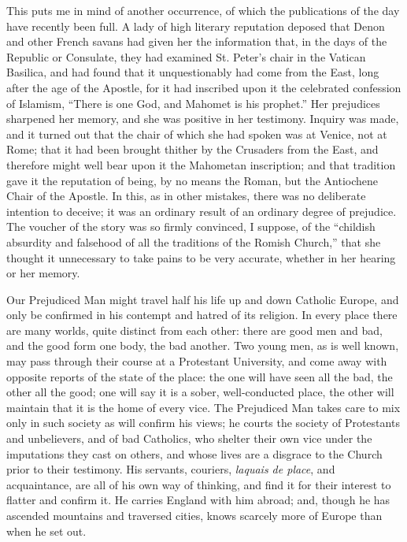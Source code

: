 This puts me in mind of another occurrence, of which
the publications of the day have recently been full. A
lady of high literary reputation deposed that Denon and
other French savans had given her the information that,
in the days of the Republic or Consulate, they had
examined St. Peter's chair in the Vatican Basilica, and
had found that it unquestionably had come from the East,
long after the age of the Apostle, for it had inscribed
upon it the celebrated confession of Islamism,
``There is one God, and Mahomet is his prophet.''
Her prejudices sharpened her memory, and she was positive
in her testimony. Inquiry was made, and it turned out
that the chair of which she had spoken was at Venice, not
at Rome; that it had been brought thither by the
Crusaders from the East, and therefore might well bear
upon it the Mahometan inscription; and that tradition
gave it the reputation of being, by no means the Roman,
but the Antiochene Chair of the Apostle. In this, as in
other mistakes, there was no deliberate intention to
deceive; it was an ordinary result of an ordinary degree
of prejudice. The voucher of the story was so firmly
convinced, I suppose, of the ``childish absurdity and
falsehood of all the traditions of the Romish
Church,'' that she thought it unnecessary to take
pains to be very accurate, whether in her hearing or her
memory.

Our Prejudiced Man might travel half his life up and
down Catholic Europe, and only be confirmed in his
contempt and hatred of its religion. In every place there
are many worlds, quite distinct from each other: there
are good men and bad, and the good form one body, the bad
another. Two young men, as is well known, may pass
through their course at a Protestant University, and come
away with opposite reports of the state of the place: the
one will have seen all the bad, the other all the good;
one will say it is a sober, well-conducted place, the
other will maintain that it is the home of every vice.
The Prejudiced Man takes care to mix only in such society
as will confirm his views; he courts the society of
Protestants and unbelievers, and of bad Catholics, who
shelter their own vice under the imputations they cast on
others, and whose lives are a disgrace to the Church
prior to their testimony. His servants, couriers, \emph{laquais
de place}, and acquaintance, are all of his own way
of thinking, and find it for their interest to flatter
and confirm it. He carries England with him abroad; and,
though he has ascended mountains and traversed cities,
knows scarcely more of Europe than when he set out.

